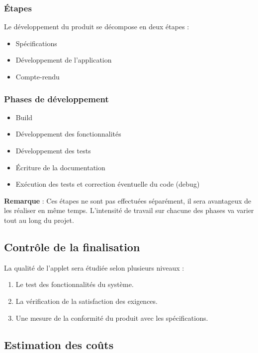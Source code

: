 			\subsubsection{Étapes}
			Le développement du produit se décompose en deux étapes :
				\begin{itemize}
				\item Spécifications
				\item Développement de l'application
				\item Compte-rendu
				\end{itemize}
				
			\subsubsection{Phases de développement}
				\begin{itemize}
				\item Build
				\item Développement des fonctionnalités
				\item Développement des tests
				\item Écriture de la documentation
				\item Exécution des tests et correction éventuelle du code (debug)
				\end{itemize}
				
				\textbf{Remarque} : Ces étapes ne sont pas effectuées séparément, il sera avantageux de les réaliser en même temps. L'intensité de travail sur chacune des phases va varier tout au long du projet.
				

		\subsection{Contrôle de la finalisation}
			La qualité de l'applet sera étudiée selon plusieurs niveaux :
			\begin{enumerate}
			\item Le test des fonctionnalités du système.
			\item La vérification de la satisfaction des exigences.
			\item Une mesure de la conformité du produit avec les spécifications.
			\end{enumerate}
			
		\subsection{Estimation des coûts}
		
